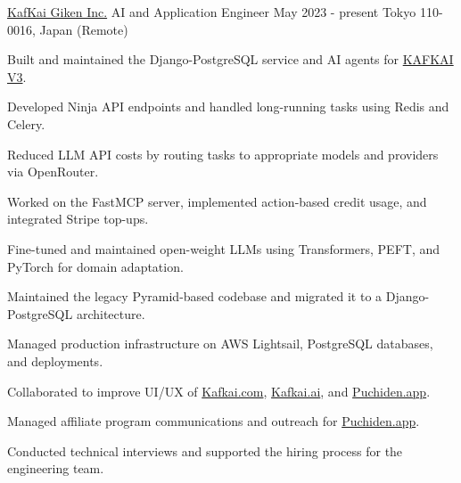\begin{cventries}



\cventry
    {\href{https://kafkai.com/}{KafKai Giken Inc.}} %
    {AI and Application Engineer} %
    {May 2023 - present} %
    {Tokyo 110-0016, Japan (Remote)} %
    {
      \begin{cvitems} %
        \item{Built and maintained the Django-PostgreSQL service and AI agents for \href{https://kafkai.com/}{\textcolor{Cerulean}{KAFKAI V3}}.}
        \item{Developed Ninja API endpoints and handled long-running tasks using Redis and Celery.}
        \item{Reduced LLM API costs by routing tasks to appropriate models and providers via OpenRouter.}
        \item{Worked on the FastMCP server, implemented action-based credit usage, and integrated Stripe top-ups.}
        \item{Fine-tuned and maintained open-weight LLMs using Transformers, PEFT, and PyTorch for domain adaptation.}
        \item{Maintained the legacy Pyramid-based codebase and migrated it to a Django-PostgreSQL architecture.}
        \item{Managed production infrastructure on AWS Lightsail, PostgreSQL databases, and deployments.}
        \item{Collaborated to improve UI/UX of \href{https://kafkai.com/}{\textcolor{Cerulean}{Kafkai.com}}, \href{https://kafkai.ai/}{\textcolor{Cerulean}{Kafkai.ai}}, and \href{https://puchiden.app/}{\textcolor{Cerulean}{Puchiden.app}}.}
        \item{Managed affiliate program communications and outreach for \href{https://puchiden.app/}{\textcolor{Cerulean}{Puchiden.app}}.}
        \item{Conducted technical interviews and supported the hiring process for the engineering team.}
      \end{cvitems}
    }



\end{cventries}
